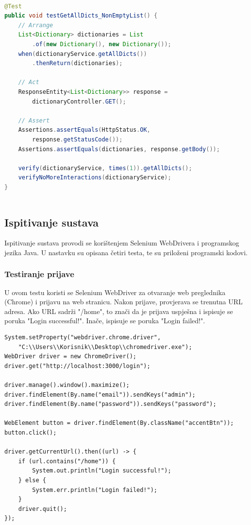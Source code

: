 			\begin{lstlisting}[language=Java]
				
@Test
public void testGetAllDicts_NonEmptyList() {
	// Arrange
	List<Dictionary> dictionaries = List
		.of(new Dictionary(), new Dictionary());
	when(dictionaryService.getAllDicts())
		.thenReturn(dictionaries);
	
	// Act
	ResponseEntity<List<Dictionary>> response = 
		dictionaryController.GET();
	
	// Assert
	Assertions.assertEquals(HttpStatus.OK, 
		response.getStatusCode());
	Assertions.assertEquals(dictionaries, response.getBody());
	
	verify(dictionaryService, times(1)).getAllDicts();
	verifyNoMoreInteractions(dictionaryService);
}
				
			\end{lstlisting}
			
			\subsection{Ispitivanje sustava}
			
			Ispitivanje sustava provodi se korištenjem Selenium WebDrivera i programskog jezika Java. U nastavku su opisana četiri testa, te su priloženi programski kodovi.
			
			\subsubsection{Testiranje prijave}

			U ovom testu koristi se Selenium WebDriver za otvaranje web preglednika (Chrome) i prijavu na web stranicu. Nakon prijave, provjerava se trenutna URL adresa. Ako URL sadrži "/home", to znači da je prijava uspješna i ispisuje se poruka "Login successful!". Inače, ispisuje se poruka "Login failed!".

			\begin{lstlisting}
System.setProperty("webdriver.chrome.driver", 
	"C:\\Users\\Korisnik\\Desktop\\chromedriver.exe");
WebDriver driver = new ChromeDriver();
driver.get("http://localhost:3000/login");

driver.manage().window().maximize();
driver.findElement(By.name("email")).sendKeys("admin");
driver.findElement(By.name("password")).sendKeys("password");

WebElement button = driver.findElement(By.className("accentBtn"));
button.click();

driver.getCurrentUrl().then((url) -> {
	if (url.contains("/home")) {
		System.out.println("Login successful!");
	} else {
		System.err.println("Login failed!");
	}
	driver.quit();        
});	

			\end{lstlisting}
			
